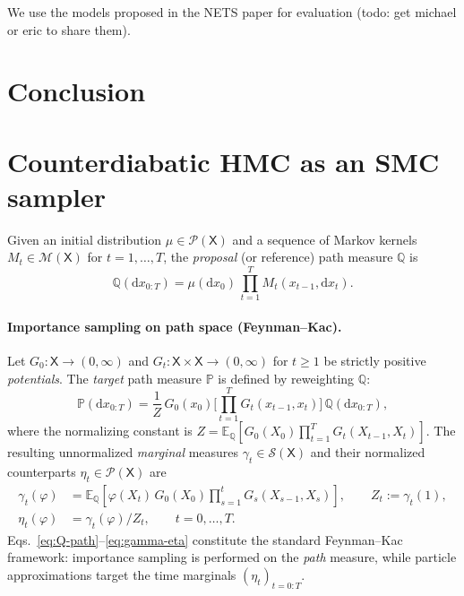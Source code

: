 \documentclass{article}
\begin{document}
We use the models proposed in the NETS paper for evaluation (todo: get michael or eric to share them).

\section{Conclusion}

\appendix

\section{Counterdiabatic HMC as an SMC sampler}
\label{app:smc}



Given an initial distribution \(\mu\in\mathcal P(\mathsf X)\) and a sequence of Markov kernels
\(M_t\in\mathcal M(\mathsf X)\) for \(t=1,\ldots,T\), the \emph{proposal} (or reference) path
measure \(\mathbb Q\) is
\begin{equation}
\label{eq:Q-path}
\mathbb Q(\mathrm d x_{0:T})
=\mu(\mathrm d x_0)\,\prod_{t=1}^T M_t(x_{t-1},\mathrm d x_t).
\end{equation}

\paragraph{Importance sampling on path space (Feynman--Kac).}
Let \(G_0:\mathsf X\to(0,\infty)\) and \(G_t:\mathsf X\times\mathsf X\to(0,\infty)\) for \(t\ge1\)
be strictly positive \emph{potentials}. The \emph{target} path measure \(\mathbb P\) is defined by
reweighting \(\mathbb Q\):
\begin{equation}
\label{eq:FK-path}
\mathbb P(\mathrm d x_{0:T})
=\frac{1}{Z}\,G_0(x_0)\Bigg[\prod_{t=1}^T G_t(x_{t-1},x_t)\Bigg]\,\mathbb Q(\mathrm d x_{0:T}),
\end{equation}
where the normalizing constant is
\(Z=\mathbb E_{\mathbb Q}\!\left[G_0(X_0)\prod_{t=1}^T G_t(X_{t-1},X_t)\right]\).
The resulting unnormalized \emph{marginal} measures \(\gamma_t\in\mathcal S(\mathsf X)\) and their
normalized counterparts \(\eta_t\in\mathcal P(\mathsf X)\) are
\begin{align}
\label{eq:gamma-eta}
\gamma_t(\varphi)&=
\mathbb E_{\mathbb Q}\!\left[\varphi(X_t)\,G_0(X_0)\prod_{s=1}^t G_s(X_{s-1},X_s)\right],\qquad
Z_t:=\gamma_t(1),\\
\eta_t(\varphi)&=\gamma_t(\varphi)/Z_t,\qquad t=0,\ldots,T .
\end{align}
Eqs.~\eqref{eq:Q-path}--\eqref{eq:gamma-eta} constitute the standard Feynman--Kac framework:
importance sampling is performed on the \emph{path} measure, while particle approximations target
the time marginals \((\eta_t)_{t=0:T}\).
\end{document}
